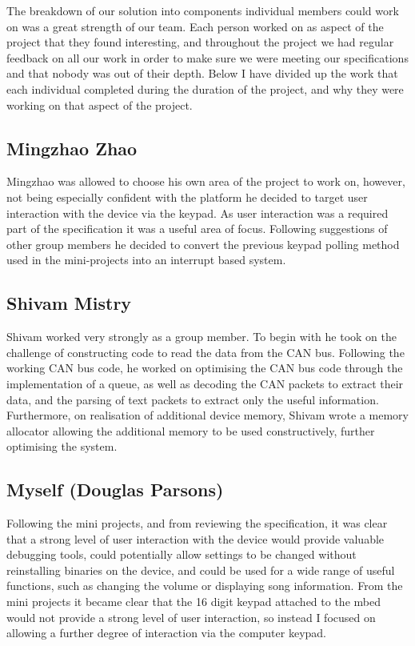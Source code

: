 The breakdown of our solution into components individual members could work on 
was a great strength of our team. Each person worked on as aspect of the project 
that they found interesting, and throughout the project we had regular feedback 
on all our work in order to make sure we were meeting our specifications and 
that nobody was out of their depth. Below I have divided up the work that each 
individual completed during the duration of the project, and why they were 
working on that aspect of the project. 

\subsection*{Mingzhao Zhao}
Mingzhao was allowed to choose his own area of the project to work on, however, 
not being especially confident with the platform he decided to target user 
interaction with the device via the keypad. As user interaction was a required 
part of the specification it was a useful area of focus. Following suggestions 
of other group members he decided to convert the previous keypad polling method 
used in the mini-projects into an interrupt based system. 

\subsection*{Shivam Mistry} 
Shivam worked very strongly as a group member. To begin with he took on the 
challenge of constructing code to read the data from the CAN bus. Following the 
working CAN bus code, he worked on optimising the CAN bus code through the
implementation of a queue, as well as decoding the CAN packets to extract their
data, and the parsing of text packets to extract only the useful information. 
Furthermore, on realisation of additional device memory, Shivam wrote a memory 
allocator allowing the additional memory to be used constructively, further 
optimising the system. 

\subsection*{Myself (Douglas Parsons)}
Following the mini projects, and from reviewing the specification, it was clear 
that a strong level of user interaction with the device would provide valuable 
debugging tools, could potentially allow settings to be changed without 
reinstalling binaries on the device, and could be used for a wide range of 
useful functions, such as changing the volume or displaying song information. 
From the mini projects it became clear that the 16 digit keypad attached to the 
mbed would not provide a strong level of user interaction, so instead I focused 
on allowing a further degree of interaction via the computer keypad.


